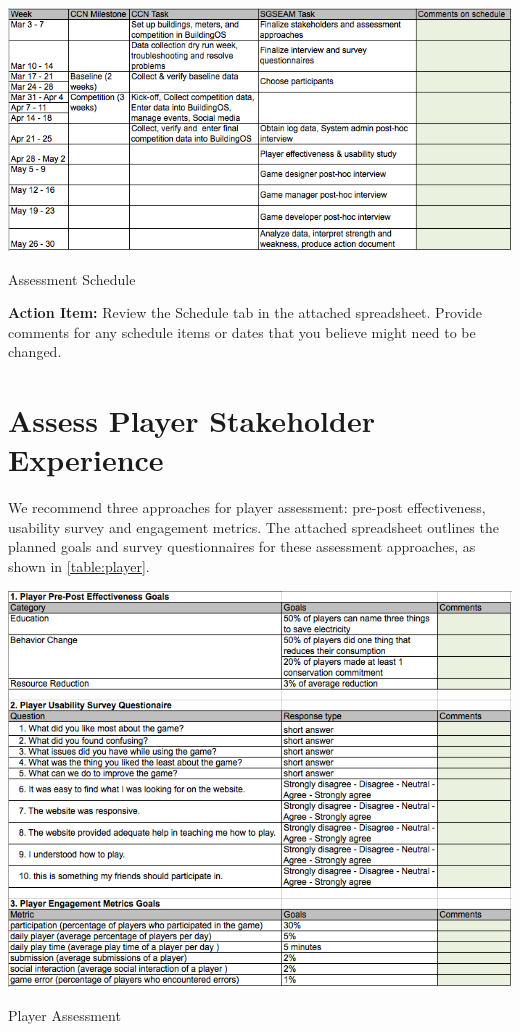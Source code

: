 \documentclass[11pt,oneside]{book}
\begin{document}
\begin{table}[ht!]
  \center
  \includegraphics[width=0.9\columnwidth]{schedule}
  \caption{Assessment Schedule}
  \label{table:schedule}
\end{table}

\begin{shadebox}
{\bf Action Item:} Review the Schedule tab in the attached
spreadsheet.  Provide comments for any schedule items or dates that
you believe might need to be changed. 
\end{shadebox}

\section{Assess Player Stakeholder Experience}

We recommend three approaches for player assessment: pre-post effectiveness, usability survey and engagement metrics. The attached spreadsheet outlines the planned goals and survey questionnaires for these assessment approaches, as shown in \autoref{table:player}.

\begin{table}[ht!]
  \center
  \includegraphics[width=0.9\columnwidth]{player}
  \caption{Player Assessment}
  \label{table:player}
\end{table}
\end{document}
